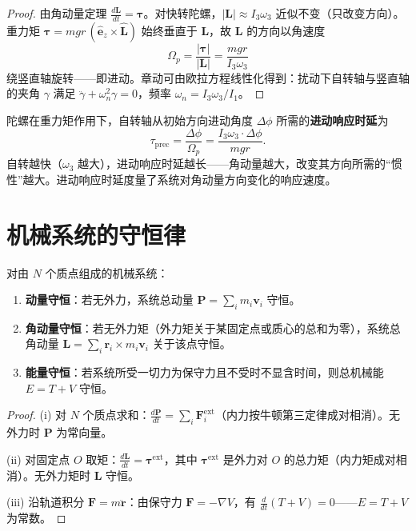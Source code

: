 \begin{proof}
由角动量定理 $\frac{d\mathbf{L}}{dt} = \boldsymbol{\tau}$。对快转陀螺，$|\mathbf{L}| \approx I_3\omega_3$ 近似不变（只改变方向）。重力矩 $\boldsymbol{\tau} = mgr\,(\hat{\mathbf{e}}_z \times \hat{\mathbf{L}})$ 始终垂直于 $\mathbf{L}$，故 $\mathbf{L}$ 的方向以角速度
\[
\Omega_p = \frac{|\boldsymbol{\tau}|}{|\mathbf{L}|} = \frac{mgr}{I_3\omega_3}
\]
绕竖直轴旋转——即进动。章动可由欧拉方程线性化得到：扰动下自转轴与竖直轴的夹角 $\gamma$ 满足 $\ddot\gamma + \omega_n^2 \gamma = 0$，频率 $\omega_n = I_3\omega_3/I_1$。
\end{proof}

\begin{definition}[陀螺的进动响应时延]\label{def:gyroscope_precession_delay}
陀螺在重力矩作用下，自转轴从初始方向进动角度 $\Delta\phi$ 所需的\textbf{进动响应时延}为
\[
\tau_{\text{prec}} = \frac{\Delta\phi}{\Omega_p} = \frac{I_3\omega_3 \cdot \Delta\phi}{mgr}.
\]
自转越快（$\omega_3$ 越大），进动响应时延越长——角动量越大，改变其方向所需的“惯性”越大。进动响应时延度量了系统对角动量方向变化的响应速度。
\end{definition}

\section{机械系统的守恒律}

\begin{theorem}[机械系统的三种守恒律]\label{thm:mechanical_conservation}
对由 $N$ 个质点组成的机械系统：
\begin{enumerate}[label=(\roman*)]
    \item \textbf{动量守恒}：若无外力，系统总动量 $\mathbf{P} = \sum_i m_i\mathbf{v}_i$ 守恒。
    \item \textbf{角动量守恒}：若无外力矩（外力矩关于某固定点或质心的总和为零），系统总角动量 $\mathbf{L} = \sum_i \mathbf{r}_i\times m_i\mathbf{v}_i$ 关于该点守恒。
    \item \textbf{能量守恒}：若系统所受一切力为保守力且不受时不显含时间，则总机械能 $E = T + V$ 守恒。
\end{enumerate}
\end{theorem}

\begin{proof}
(i) 对 $N$ 个质点求和：$\frac{d\mathbf{P}}{dt} = \sum_i \mathbf{F}_i^{\text{ext}}$（内力按牛顿第三定律成对相消）。无外力时 $\mathbf{P}$ 为常向量。

(ii) 对固定点 $O$ 取矩：$\frac{d\mathbf{L}}{dt} = \boldsymbol{\tau}^{\text{ext}}$，其中 $\boldsymbol{\tau}^{\text{ext}}$ 是外力对 $O$ 的总力矩（内力矩成对相消）。无外力矩时 $\mathbf{L}$ 守恒。

(iii) 沿轨道积分 $\mathbf{F} = m\ddot{\mathbf{r}}$：由保守力 $\mathbf{F} = -\nabla V$，有 $\frac{d}{dt}(T+V) = 0$——$E = T + V$ 为常数。
\end{proof}

